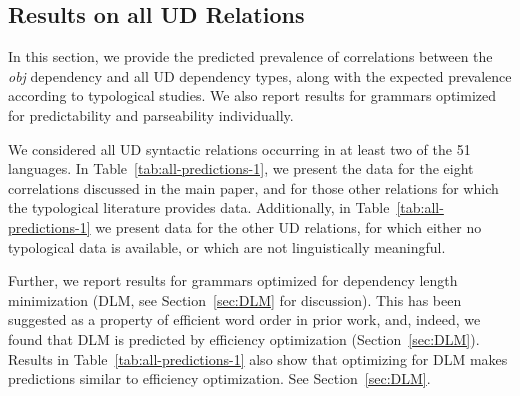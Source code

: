 \documentclass[10pt,twoside,lineno]{article}
\begin{document}
%    
%    
%    



\subsection{Results on all UD Relations}
In this section, we provide the predicted prevalence of correlations between the \emph{obj} dependency and all UD dependency types, along with the expected prevalence according to typological studies.
We also report results for grammars optimized for predictability and parseability individually.


We considered all UD syntactic relations occurring in at least two of the 51 languages.
In Table~\ref{tab:all-predictions-1}, we present the data for the eight correlations discussed in the main paper, and for those other relations for which the typological literature provides data.
Additionally, in Table~\ref{tab:all-predictions-1} we present data for the other UD relations, for which either no typological data is available, or which are not linguistically meaningful.




Further, we report results for grammars optimized for dependency length minimization (DLM, see Section~\ref{sec:DLM} for discussion).
This has been suggested as a property of efficient word order in prior work, and, indeed, we found that DLM is predicted by efficiency optimization (Section~\ref{sec:DLM}).
Results in Table~\ref{tab:all-predictions-1} also show that optimizing for DLM makes predictions similar to efficiency optimization. See Section~\ref{sec:DLM}.




\end{document}

